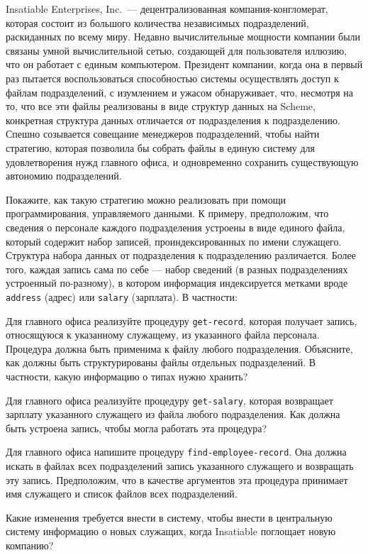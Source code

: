 \begin{exercise}{2.74}\label{EX2.74}%
Insatiable Enterprises, Inc.~--- децентрализованная
компания-конгломерат, которая состоит из большого количества
независимых подразделений, раскиданных по всему миру.  Недавно
вычислительные мощности компании были связаны умной вычислительной
сетью, создающей для пользователя иллюзию, что он работает с
единым компьютером.  Президент компании, когда она в первый раз
пытается воспользоваться способностью системы осуществлять доступ к
файлам подразделений, с изумлением и ужасом обнаруживает, что,
несмотря на то, что все эти файлы реализованы в виде структур данных
на Scheme, конкретная структура данных отличается от подразделения к
подразделению.  Спешно созывается совещание менеджеров подразделений,
чтобы найти стратегию, которая позволила бы собрать файлы в единую
систему для удовлетворения нужд главного офиса, и одновременно сохранить
существующую автономию подразделений.

Покажите, как такую стратегию можно реализовать при
помощи программирования, управляемого данными.  К примеру,
предположим, что сведения о персонале каждого подразделения устроены в
виде единого файла, который содержит набор записей, проиндексированных
по имени служащего.  Структура набора данных от подразделения к
подразделению различается.  Более того, каждая запись сама по себе ---
набор сведений (в разных подразделениях устроенный по-разному), в
котором информация индексируется метками вроде
{\tt address} (адрес) или {\tt salary} (зарплата).  В
частности:
\begin{plainenum}

\item
 Для главного офиса реализуйте процедуру
{\tt get-record}, которая получает запись, относящуюся к
указанному служащему, из указанного файла персонала.  Процедура должна
быть применима к файлу любого подразделения.  Объясните, как должны
быть структурированы файлы отдельных подразделений.  В частности,
какую информацию о типах нужно хранить?

\item
 Для главного офиса реализуйте процедуру
{\tt get-salary}, которая возвращает зарплату указанного
служащего из файла любого подразделения.  Как должна быть устроена
запись, чтобы могла работать эта процедура?

\item
 Для главного офиса напишите процедуру
{\tt find-employee-record}.  Она должна искать в файлах всех
подразделений запись указанного служащего и возвращать эту запись.
Предположим, что в качестве аргументов эта процедура принимает имя
служащего и список файлов всех подразделений.

\item
 Какие изменения требуется внести в систему, чтобы внести в центральную
систему информацию о новых служащих, когда
Insatiable поглощает новую компанию?
\end{plainenum}
\end{exercise}

